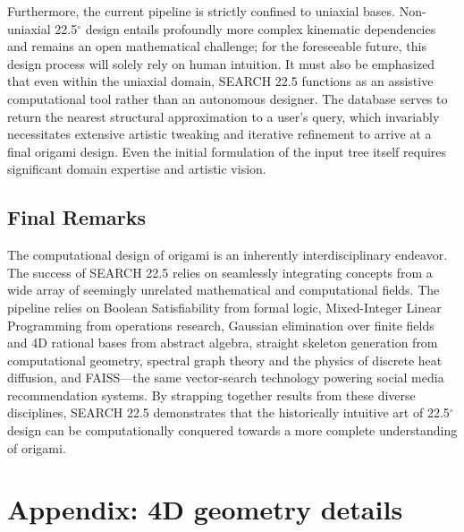 \documentclass[11pt]{article}
\begin{document}
Furthermore, the current pipeline is strictly confined to uniaxial bases. Non-uniaxial 22.5$^\circ$ design entails profoundly more complex kinematic dependencies and remains an open mathematical challenge; for the foreseeable future, this design process will solely rely on human intuition. It must also be emphasized that even within the uniaxial domain, SEARCH 22.5 functions as an assistive computational tool rather than an autonomous designer. The database serves to return the nearest structural approximation to a user's query, which invariably necessitates extensive artistic tweaking and iterative refinement to arrive at a final origami design. Even the initial formulation of the input tree itself requires significant domain expertise and artistic vision.

\subsection{Final Remarks}
The computational design of origami is an inherently interdisciplinary endeavor. The success of SEARCH 22.5 relies on seamlessly integrating concepts from a wide array of seemingly unrelated mathematical and computational fields. The pipeline relies on Boolean Satisfiability from formal logic, Mixed-Integer Linear Programming from operations research, Gaussian elimination over finite fields and 4D rational bases from abstract algebra, straight skeleton generation from computational geometry, spectral graph theory and the physics of discrete heat diffusion, and FAISS---the same vector-search technology powering social media recommendation systems. By strapping together results from these diverse disciplines, SEARCH 22.5 demonstrates that the historically intuitive art of 22.5$^\circ$ design can be computationally conquered towards a more complete understanding of origami.

\newpage
\printbibliography

\appendix 

\section{Appendix: 4D geometry details}
\end{document}
